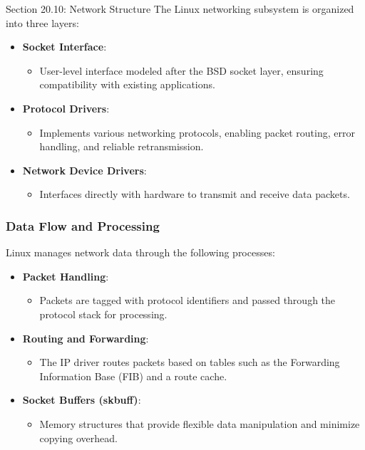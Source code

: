 \begin{notes}{Section 20.10: Network Structure}
    The Linux networking subsystem is organized into three layers:
    \begin{itemize}
        \item \textbf{Socket Interface}:
        \begin{itemize}
            \item User-level interface modeled after the BSD socket layer, ensuring compatibility with existing applications.
        \end{itemize}
        \item \textbf{Protocol Drivers}:
        \begin{itemize}
            \item Implements various networking protocols, enabling packet routing, error handling, and reliable retransmission.
        \end{itemize}
        \item \textbf{Network Device Drivers}:
        \begin{itemize}
            \item Interfaces directly with hardware to transmit and receive data packets.
        \end{itemize}
    \end{itemize}
    
    \subsubsection*{Data Flow and Processing}
    
    Linux manages network data through the following processes:
    \begin{itemize}
        \item \textbf{Packet Handling}:
        \begin{itemize}
            \item Packets are tagged with protocol identifiers and passed through the protocol stack for processing.
        \end{itemize}
        \item \textbf{Routing and Forwarding}:
        \begin{itemize}
            \item The IP driver routes packets based on tables such as the Forwarding Information Base (FIB) and a route cache.
        \end{itemize}
        \item \textbf{Socket Buffers (skbuff)}:
        \begin{itemize}
            \item Memory structures that provide flexible data manipulation and minimize copying overhead.
        \end{itemize}
    \end{itemize}
    

\end{notes}
